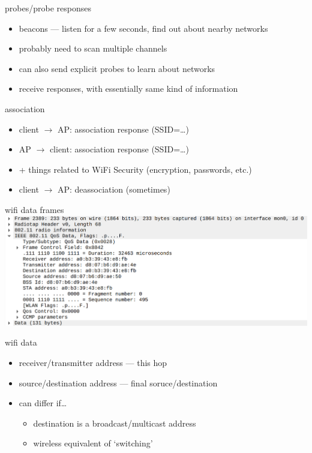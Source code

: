\begin{frame}{probes/probe responses}
    \begin{itemize}
    \item beacons --- listen for a few seconds, find out about nearby networks
    \item probably need to scan multiple channels
    \vspace{.5cm}
    \item can also send explicit probes to learn about networks
    \item receive responses, with essentially same kind of information
    \end{itemize}
\end{frame}

\begin{frame}{association}
    \begin{itemize}
    \item client $\rightarrow$ AP: association response (SSID=\ldots)
    \item AP $\rightarrow$ client: association response (SSID=\ldots)
    \item + things related to WiFi Security (encryption, passwords, etc.)
    \vspace{.5cm}
    \item client $\rightarrow$ AP: deassociation (sometimes)
    \end{itemize}
\end{frame}

\begin{frame}{wifi data frames}
\includegraphics[height=0.85\textheight]{../multiaccess/wifi-data-1.png}
\end{frame}

\begin{frame}{wifi data}
    \begin{itemize}
    \item receiver/transmitter address --- this hop
    \item source/destination address --- final soruce/destination
    \vspace{.5cm}
    \item can differ if\ldots
        \begin{itemize}
        \item destination is a broadcast/multicast address
        \item wireless equivalent of `switching'
        \end{itemize}
    \end{itemize}
\end{frame}
